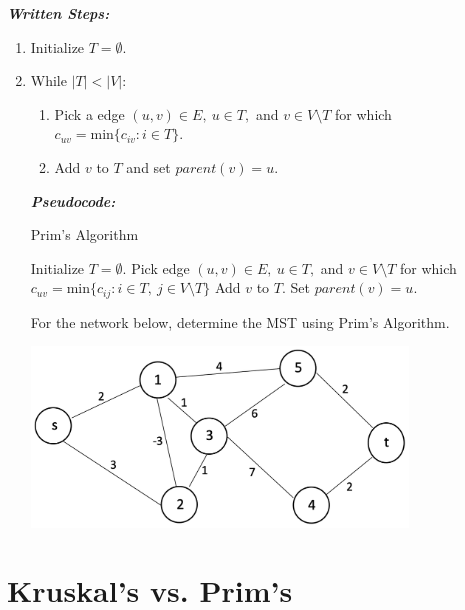 \documentclass[12pt]{article}
\theoremstyle{definition}
\begin{document}
\vfill
\emph{\textbf{Written Steps:}}

\begin{enumerate}

	\item Initialize $T = \emptyset$.
	\item While $|T| < |V|$:
	\begin{enumerate}
		\item Pick a edge $(u,v) \in E, \ u \in T,$ and $ v \in V \setminus T$ for which $c_{uv} = \textrm{min}\{c_{iv}: i \in T\}$.
		\item Add $v$ to $T$ and set $parent(v) = u$.
	\end{enumerate}

\vfill
\emph{\textbf{Pseudocode:}}


\begin{algorithm}
\caption{Prim's Algorithm}
\begin{algorithmic} 
\STATE Initialize $T = \emptyset$.
	\STATE Pick edge $(u,v) \in E, \ u \in T,$ and $ v \in V \setminus T$ for which $c_{uv} = \textrm{min}\{c_{ij}: i \in T, \ j \in V\setminus T\}$
	\STATE Add $v$ to $T$.
	\STATE Set $parent(v) = u$.
\ENDWHILE
\end{algorithmic}
\end{algorithm}

\vfill
\newpage
For the network below, determine the MST using Prim's Algorithm.

\begin{center}
\includegraphics[width=10cm]{minspanningtree}
\end{center}


\newpage

\end{enumerate}


\section{Kruskal's vs. Prim's}
\end{document}
